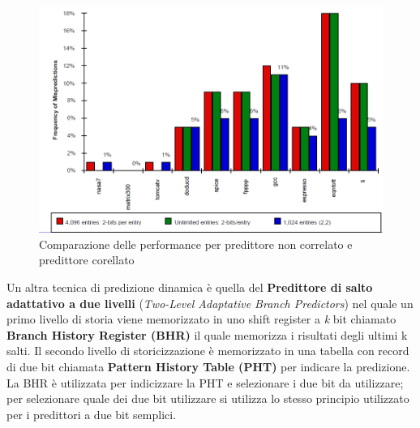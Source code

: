 \begin{figure}[htb]
\centering
\includegraphics[scale=0.5]{img/performance.png}
\caption{Comparazione delle performance per predittore non correlato e predittore corellato}\label{fig:performance}
\end{figure}
Un altra tecnica di predizione dinamica è quella del \textbf{Predittore di salto adattativo a due livelli} (\emph{Two-Level Adaptative Branch Predictors}) nel quale un primo livello di storia viene memorizzato in uno shift register a \emph{k} bit chiamato \textbf{Branch History Register (BHR)} il quale memorizza i risultati degli ultimi k salti. Il secondo livello di storicizzazione è memorizzato in una tabella con record di due bit chiamata \textbf{Pattern History Table (PHT)} per indicare la predizione.
La BHR è utilizzata per indicizzare la PHT e selezionare i due bit da utilizzare; per selezionare quale dei due bit utilizzare si utilizza lo stesso principio utilizzato per i predittori a due bit semplici.
